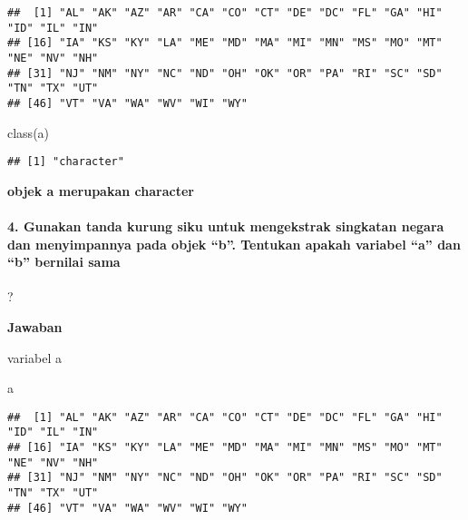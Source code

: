 \documentclass[
]{article}
\newenvironment{Shaded}{\begin{snugshade}}{\end{snugshade}}
\newcommand{\FunctionTok}[1]{\textcolor[rgb]{0.00,0.00,0.00}{#1}}
\newcommand{\NormalTok}[1]{#1}
\newcommand{\OtherTok}[1]{\textcolor[rgb]{0.56,0.35,0.01}{#1}}
\newcommand{\SpecialCharTok}[1]{\textcolor[rgb]{0.00,0.00,0.00}{#1}}
\newcommand{\StringTok}[1]{\textcolor[rgb]{0.31,0.60,0.02}{#1}}
\begin{document}
\begin{verbatim}
##  [1] "AL" "AK" "AZ" "AR" "CA" "CO" "CT" "DE" "DC" "FL" "GA" "HI" "ID" "IL" "IN"
## [16] "IA" "KS" "KY" "LA" "ME" "MD" "MA" "MI" "MN" "MS" "MO" "MT" "NE" "NV" "NH"
## [31] "NJ" "NM" "NY" "NC" "ND" "OH" "OK" "OR" "PA" "RI" "SC" "SD" "TN" "TX" "UT"
## [46] "VT" "VA" "WA" "WV" "WI" "WY"
\end{verbatim}

\begin{Shaded}
\begin{Highlighting}[]
\FunctionTok{class}\NormalTok{(a)}
\end{Highlighting}
\end{Shaded}

\begin{verbatim}
## [1] "character"
\end{verbatim}

\textbf{objek a merupakan character}

\hypertarget{gunakan-tanda-kurung-siku-untuk-mengekstrak-singkatan-negara-dan-menyimpannya-pada-objek-b.-tentukan-apakah-variabel-a-dan-b-bernilai-sama}{%
\paragraph{4. Gunakan tanda kurung siku untuk mengekstrak singkatan
negara dan menyimpannya pada objek ``b''. Tentukan apakah variabel ``a''
dan ``b'' bernilai
sama}\label{gunakan-tanda-kurung-siku-untuk-mengekstrak-singkatan-negara-dan-menyimpannya-pada-objek-b.-tentukan-apakah-variabel-a-dan-b-bernilai-sama}}

?

\textbf{Jawaban}

\begin{Shaded}
\end{Shaded}

variabel a

\begin{Shaded}
\begin{Highlighting}[]
\NormalTok{a}
\end{Highlighting}
\end{Shaded}

\begin{verbatim}
##  [1] "AL" "AK" "AZ" "AR" "CA" "CO" "CT" "DE" "DC" "FL" "GA" "HI" "ID" "IL" "IN"
## [16] "IA" "KS" "KY" "LA" "ME" "MD" "MA" "MI" "MN" "MS" "MO" "MT" "NE" "NV" "NH"
## [31] "NJ" "NM" "NY" "NC" "ND" "OH" "OK" "OR" "PA" "RI" "SC" "SD" "TN" "TX" "UT"
## [46] "VT" "VA" "WA" "WV" "WI" "WY"
\end{verbatim}
\end{document}
